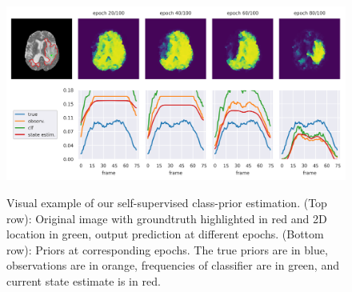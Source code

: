 \begin{figure}[t]
\caption{Visual example of our self-supervised class-prior estimation. (Top row): Original image with groundtruth highlighted in red and 2D location in green, output prediction at different epochs. (Bottom row): Priors at corresponding epochs. The true priors are in blue, observations are in orange, frequencies of classifier are in green, and current state estimate is in red.}
\centering
    \includegraphics[width=.9\textwidth]{pics/prevs_conv.png}
\label{fig:prevs_conv}
\end{figure}


